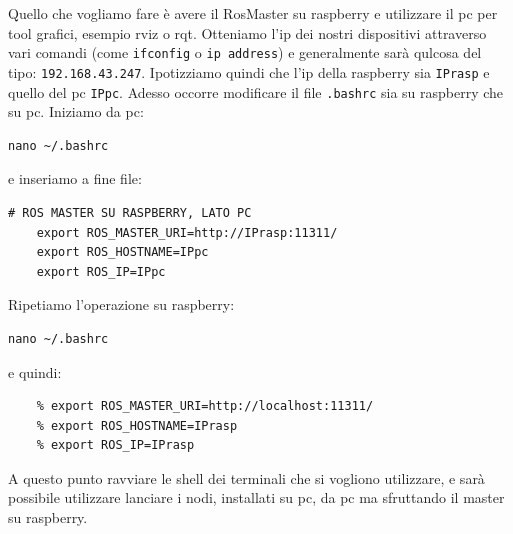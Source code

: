 Quello che  vogliamo fare \`e avere il RosMaster su raspberry e utilizzare il pc per tool grafici, esempio rviz o rqt. 
Otteniamo l'ip dei nostri dispositivi attraverso vari comandi (come \texttt{ifconfig} o \texttt{ip address}) e generalmente sar\`a qulcosa del tipo: \verb|192.168.43.247|. 
Ipotizziamo quindi che l'ip della raspberry sia \texttt{IPrasp} e quello del pc \texttt{IPpc}. 
Adesso occorre modificare il file \texttt{.bashrc} sia su raspberry che su pc. Iniziamo da pc:
\begin{lstlisting}[style=bashpc]
	nano ~/.bashrc 
\end{lstlisting}
e inseriamo a fine file:
\begin{lstlisting}[style=xml]
	# ROS MASTER SU RASPBERRY, LATO PC
	export ROS_MASTER_URI=http://IPrasp:11311/
	export ROS_HOSTNAME=IPpc
	export ROS_IP=IPpc
\end{lstlisting}

Ripetiamo l'operazione su raspberry:
\begin{lstlisting}[style=bash]
	nano ~/.bashrc 
\end{lstlisting}
e quindi:
\begin{lstlisting}[style=xml]
	% # ROS MASTER SU RASPBERRY, LATO RASPBERRY
	% export ROS_MASTER_URI=http://localhost:11311/
	% export ROS_HOSTNAME=IPrasp
	% export ROS_IP=IPrasp
\end{lstlisting}

A questo punto ravviare le shell dei terminali che si vogliono utilizzare, e sar\`a possibile utilizzare lanciare i nodi, installati su pc, da pc ma sfruttando il master su raspberry.

\newpage
